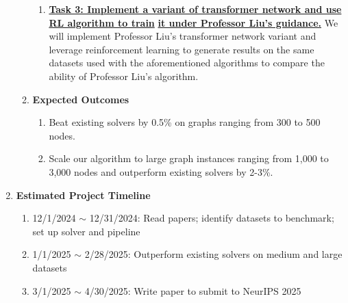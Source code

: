 \documentclass{article}
\begin{document}
\begin{enumerate}
\begin{enumerate}
\begin{enumerate}
		\item \textbf{\underline{Task 3: Implement a variant of transformer network and use RL algorithm to train}}
		\newline
		\textbf{\underline{it under Professor Liu's guidance.}} We will implement Professor Liu's transformer network variant and leverage reinforcement learning to generate results on the same datasets used with the aforementioned algorithms to compare the ability of Professor Liu's algorithm.

	\end{enumerate}

	\item \textbf{Expected Outcomes}
	
	\begin{enumerate}
		\item Beat existing solvers by 0.5\% on graphs ranging from 300 to 500 nodes.
		\item Scale our algorithm to large graph instances ranging from 1,000 to 3,000 nodes and outperform existing solvers by 2-3\%.
	\end{enumerate}

\end{enumerate}

\item \textbf{Estimated Project Timeline}
\begin{enumerate}
	\item 12/1/2024 $\sim$ 12/31/2024: Read papers; identify datasets to benchmark; set up solver and pipeline
	\item 1/1/2025 $\sim$ 2/28/2025: Outperform existing solvers on medium and large datasets
	\item 3/1/2025 $\sim$ 4/30/2025: Write paper to submit to NeurIPS 2025
\end{enumerate}

\end{enumerate}
\end{document}
